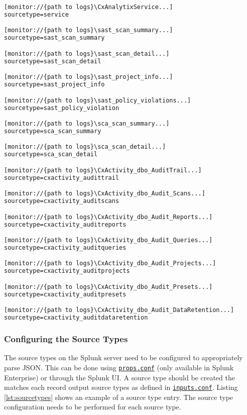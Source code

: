 \begin{lstlisting}[caption={Log4Net Record File Appenders}, label={lst:inputsconf}, language=XML]
[monitor://{path to logs}\CxAnalytixService...]
sourcetype=service

[monitor://{path to logs}\sast_scan_summary...]
sourcetype=sast_scan_summary

[monitor://{path to logs}\sast_scan_detail...]
sourcetype=sast_scan_detail

[monitor://{path to logs}\sast_project_info...]
sourcetype=sast_project_info

[monitor://{path to logs}\sast_policy_violations...]
sourcetype=sast_policy_violation

[monitor://{path to logs}\sca_scan_summary...]
sourcetype=sca_scan_summary

[monitor://{path to logs}\sca_scan_detail...]
sourcetype=sca_scan_detail

[monitor://{path to logs}\CxActivity_dbo_AuditTrail...]
sourcetype=cxactivity_audittrail

[monitor://{path to logs}\CxActivity_dbo_Audit_Scans...]
sourcetype=cxactivity_auditscans

[monitor://{path to logs}\CxActivity_dbo_Audit_Reports...]
sourcetype=cxactivity_auditreports

[monitor://{path to logs}\CxActivity_dbo_Audit_Queries...]
sourcetype=cxactivity_auditqueries

[monitor://{path to logs}\CxActivity_dbo_Audit_Projects...]
sourcetype=cxactivity_auditprojects

[monitor://{path to logs}\CxActivity_dbo_Audit_Presets...]
sourcetype=cxactivity_auditpresets

[monitor://{path to logs}\CxActivity_dbo_Audit_DataRetention...]
sourcetype=cxactivity_auditdataretention
\end{lstlisting}

\subsubsection{Configuring the Source Types}

The source types on the Splunk server need to be configured to appropriately parse JSON.  
This can be done using \href{https://docs.splunk.com/Documentation/Splunk/latest/Admin/Propsconf}{\texttt{props.conf}} (only available in Splunk Enterprise) 
or through the Splunk UI. A source type should be created the matches each record output source types as defined in 
\href{https://docs.splunk.com/Documentation/Splunk/latest/Admin/Inputsconf}{\texttt{inputs.conf}}.  Listing \ref{lst:sourcetypes} shows an example
of a source type entry.  The source type configuration needs to be performed for each source type.


